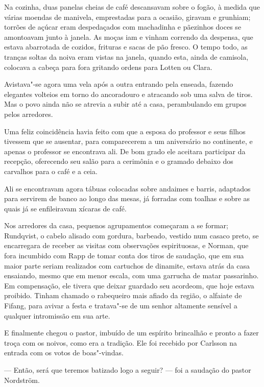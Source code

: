 Na cozinha, duas panelas cheias de café
descansavam sobre o fogão, à medida que várias moendas de manivela, 
emprestadas para a ocasião, giravam e grunhiam; torrões de açúcar eram
despedaçados com machadinha e pãezinhos doces se amontoavam junto à janela. As
moças iam e vinham correndo da despensa, que estava abarrotada de cozidos,
frituras e sacas de pão fresco. O tempo todo, as tranças soltas da noiva eram
vistas na janela, quando esta, ainda de camisola, colocava a cabeça para fora
gritando ordens para Lotten ou Clara. 

Avistava"-se agora uma vela após a outra entrando
pela enseada, fazendo elegantes volteios em torno do ancoradouro e 
atracando sob uma salva de tiros. Mas o povo ainda não se atrevia a subir até a
casa, perambulando em grupos pelos arredores. 

Uma feliz coincidência havia feito com que a esposa do professor e seus filhos tivessem
que se ausentar, para comparecerem a um aniversário no continente, e apenas o
professor se encontrava ali. De bom grado ele aceitara participar da recepção,
oferecendo seu salão para a cerimônia e o gramado debaixo dos carvalhos para o
café e a ceia. 

Ali se encontravam agora tábuas colocadas sobre andaimes e
barris, adaptados para servirem de banco ao longo das mesas, já
forradas com toalhas e sobre as quais já se enfileiravam xícaras de café. 

Nos arredores da casa, pequenos agrupamentos começaram a se
formar; Rundqvist, o cabelo alisado com gordura, barbeado, vestido num casaco
preto, se encarregara de receber as visitas com observações espirituosas, e
Norman, que fora incumbido com Rapp de tomar conta dos tiros de saudação,
que em sua maior parte seriam realizados com cartuchos de dinamite, estava atrás
da casa ensaiando, mesmo que em menor escala, com uma garrucha de matar passarinho. Em
compensação, ele tivera que deixar guardado seu acordeom, que hoje estava
proibido. Tinham chamado o rabequeiro mais afiado da região, o alfaiate de Fifang,
para avivar a festa e tratava"-se de um senhor altamente sensível a qualquer
intromissão em sua arte. 

E finalmente chegou o pastor, imbuído de um espírito brincalhão
e pronto a fazer troça com os noivos, como era a tradição. Ele foi recebido por
Carlsson na entrada com os votos de boas"-vindas.

--- Então, será que teremos batizado logo a seguir? --- foi a saudação do pastor
Nordström.

